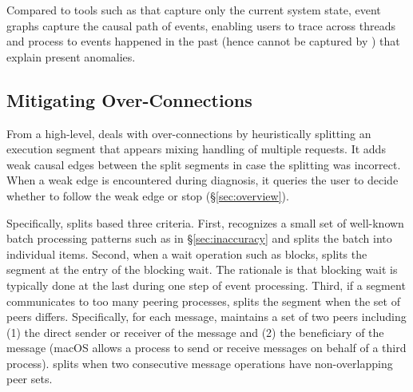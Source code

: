 Compared to tools such as \spindump that capture only the current
system state, event graphs capture the causal path of events, enabling
users to trace across threads and process to events happened in the past
(hence cannot be captured by \spindump) that explain present
anomalies.



\subsection{Mitigating Over-Connections}\label{subsec:fix-over}

From a high-level, \xxx deals with over-connections by heuristically
splitting an execution segment that appears mixing handling of multiple
requests.  It adds weak causal edges between the split segments in case
the splitting was incorrect.  When a weak edge is encountered during
diagnosis, it queries the user to decide whether to follow the weak edge
or stop (\S\ref{sec:overview}).

Specifically, \xxx splits based three criteria.  First, \xxx recognizes a
small set of well-known batch processing patterns such as
 in \S\ref{sec:inaccuracy} and splits the
batch into individual items.  Second, when a wait operation such as
 blocks, \xxx splits the segment at the entry of the blocking
wait.  The rationale is that blocking wait is typically done at the last
during one step of event processing.  Third, if a segment communicates to
too many peering processes, \xxx splits the segment when the set of peers
differs.  Specifically, for each message, \xxx maintains a set of two
peers including (1) the direct sender or receiver of the message and (2)
the beneficiary of the message (macOS allows a process to send or receive
messages on behalf of a third process).  \xxx splits when two consecutive
message operations have non-overlapping peer sets.

